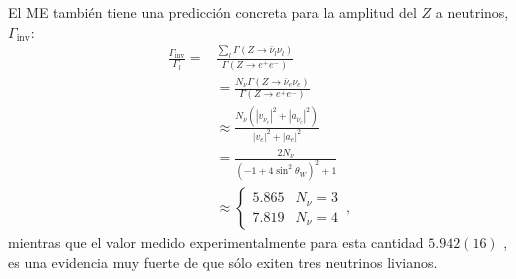El ME también tiene una predicción concreta para la amplitud del $Z$ a neutrinos, $\Gamma_{\text{inv}}$:
\begin{align}
  \frac{\Gamma_{\text{inv}}}{\Gamma_l}=&\frac{\sum_l\Gamma(Z\to\bar{\nu}_l\nu_l)}{\Gamma(Z\to e^+ e^-)}\nonumber\\
  &=\frac{N_\nu\Gamma(Z\to\bar{\nu}_e\nu_e)}{\Gamma(Z\to e^+ e^-)}\nonumber\\
  &\approx\frac{N_\nu(|v_{\nu_e}|^2+|a_{\nu_e}|^2)}{|v_{e}|^2+|a_{e}|^2}\nonumber\\
  &=\frac{2N_\nu}{(-1+4\sin^2\theta_W)^2+1}\nonumber\\
  &\approx\begin{cases}
    5.865&N_\nu=3\\
    7.819&N_\nu=4
  \end{cases}\,,
\end{align}
mientras que el valor medido experimentalmente para esta cantidad $5.942(16)$ \cite{a}, es una evidencia muy fuerte de que sólo exiten tres neutrinos livianos. 

